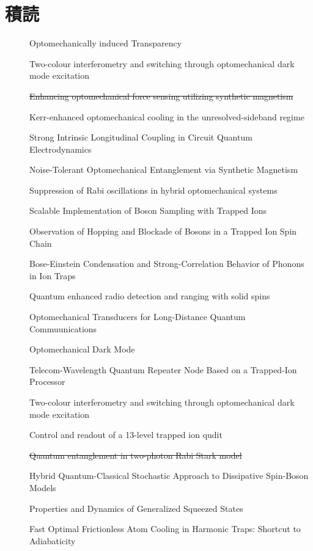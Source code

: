 \documentclass{report}
\begin{document}
  \chapter{積読}
    \begin{description}
      \item[\cite{science.1195596}] Optomechanically induced Transparency
      \item[\cite{lake2020two}] Two-colour interferometry and switching through optomechanical dark mode excitation
      \item[\cite{PhysRevA.111.053508}] \sout{Enhancing optomechanical force sensing utilizing synthetic magnetism}
      \item[\cite{PhysRevA.111.053505}] Kerr-enhanced optomechanical cooling in the unresolved-sideband regime
      \item[\cite{PhysRevLett.134.153603}] Strong Intrinsic Longitudinal Coupling in Circuit Quantum Electrodynamics
      \item[\cite{PhysRevLett.129.063602}] Noise-Tolerant Optomechanical Entanglement via Synthetic Magnetism
      \item[\cite{PhysRevA.92.043822}] Suppression of Rabi oscillations in hybrid optomechanical systems
      \item[\cite{PhysRevLett.112.050504}] Scalable Implementation of Boson Sampling with Trapped Ions
      \item[\cite{PhysRevLett.120.073001}] Observation of Hopping and Blockade of Bosons in a Trapped Ion Spin Chain
      \item[\cite{PhysRevLett.93.263602}] Bose-Einstein Condensation and Strong-Correlation Behavior of Phonons in Ion Traps
      \item[\cite{chen2023quantum}] Quantum enhanced radio detection and ranging with solid spins
      \item[\cite{PhysRevLett.105.220501}] Optomechanical Transducers for Long-Distance Quantum Commuunications
      \item[\cite{science.1228370}] Optomechanical Dark Mode
      \item[\cite{PhysRevLett.130.213601}] Telecom-Wavelength Quantum Repeater Node Based on a Trapped-Ion Processor
      \item[\cite{lake2020two}] Two-colour interferometry and switching through optomechanical dark mode excitation
      \item[\cite{low2025control}] Control and readout of a 13-level trapped ion qudit 
      \item[\cite{boutakka2025quantum}] \sout{Quantum entanglement in two-photon Rabi Stark model}
      \item[\cite{PhysRevX.15.021073}] Hybrid Quantum-Classical Stochastic Approach to Dissipative Spin-Boson Models
      \item[\cite{ashhabPropertiesDynamicsGeneralized2025b}] Properties and Dynamics of Generalized Squeezed States
      \item[\cite{PhysRevLett.104.063002}] Fast Optimal Frictionless Atom Cooling in Harmonic Traps: Shortcut to Adiabaticity
    \end{description}
  \printbibliography
\end{document}
